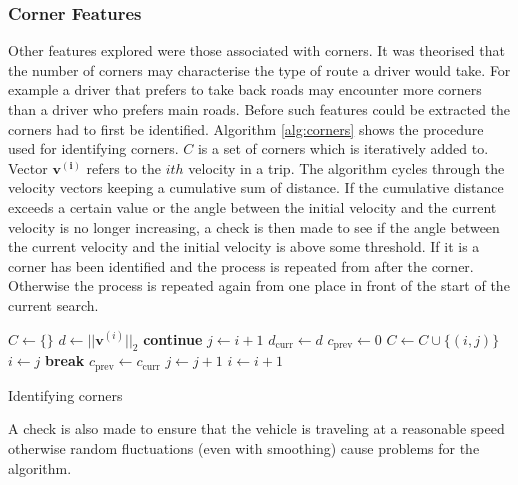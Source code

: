 \documentclass[a4paper, 11pt, twocolumn]{report}
\begin{document}
\subsubsection{Corner Features}
Other features explored were those associated with corners. It was theorised that the number of corners may characterise the type of route a driver would take. For example a driver that prefers to take back roads may encounter more corners than a driver who prefers main roads. Before such features could be extracted the corners had to first be identified. Algorithm \ref{alg:corners} shows the procedure used for identifying corners. $C$ is a set of corners which is iteratively added to. Vector $\mathbf{v^{(i)}}$ refers to the $ith$ velocity in a trip. The algorithm cycles through the velocity vectors keeping a cumulative sum of distance. If the cumulative distance exceeds a certain value or the angle between the initial velocity and the current velocity is no longer increasing, a check is then made to see if the angle between the current velocity and the initial velocity is above some threshold. If it is a corner has been identified and the process is repeated from after the corner. Otherwise the process is repeated again from one place in front of the start of the current search.

\begin{algorithm}
\begin{algorithmic}
    \State $C \gets \{\}$
        \State $d \gets ||\mathbf{v}^{(i)}||_2$
            \State \textbf{continue}
        \EndIf
        \State $j \gets i + 1$
        \State $d_{\text{curr}} \gets d$    
        \State $c_{\text{prev}} \gets 0$ 
        \Loop
                    \State $C \gets C \cup \{(i, j)\}$
                    \State $i \gets j$
                \EndIf
                \State \textbf{break}
            \EndIf
            \State $c_{\text{prev}} \gets c_{\text{curr}}$ 
            \State $j \gets j+1$
        \EndLoop
        \State $i \gets i+1$
    \EndWhile
\end{algorithmic}
\caption{Identifying corners}
\label{alg:corners}
\end{algorithm}

A check is also made to ensure that the vehicle is traveling at a reasonable speed otherwise random fluctuations (even with smoothing) cause problems for the algorithm.
\end{document}

